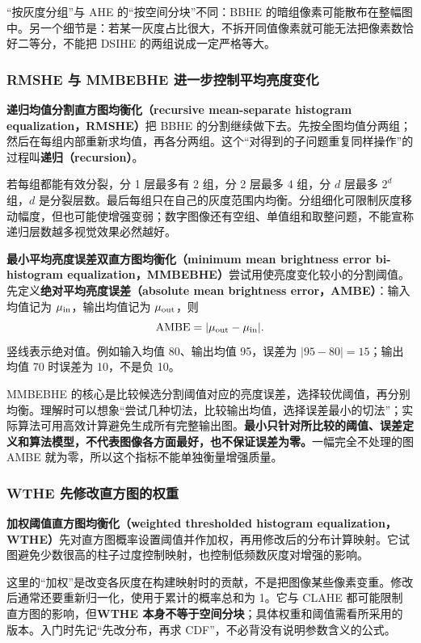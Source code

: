 “按灰度分组”与 AHE 的“按空间分块”不同：BBHE 的暗组像素可能散布在整幅图中。另一个细节是：若某一灰度占比很大，不拆开同值像素就可能无法把像素数恰好二等分，不能把 DSIHE 的两组说成一定严格等大。

\subsubsection*{RMSHE 与 MMBEBHE 进一步控制平均亮度变化}

\textbf{递归均值分割直方图均衡化（recursive mean-separate histogram equalization，RMSHE）}把 BBHE 的分割继续做下去。先按全图均值分两组；然后在每组内部重新求均值，再各分两组。这个“对得到的子问题重复同样操作”的过程叫\textbf{递归（recursion）}。

若每组都能有效分裂，分 1 层最多有 2 组，分 2 层最多 4 组，分 $d$ 层最多 $2^d$ 组，$d$ 是分裂层数。最后每组只在自己的灰度范围内均衡。分组细化可限制灰度移动幅度，但也可能使增强变弱；数字图像还有空组、单值组和取整问题，不能宣称递归层数越多视觉效果必然越好。

\textbf{最小平均亮度误差双直方图均衡化（minimum mean brightness error bi-histogram equalization，MMBEBHE）}尝试用使亮度变化较小的分割阈值。先定义\textbf{绝对平均亮度误差（absolute mean brightness error，AMBE）}：输入均值记为 $\mu_{\rm in}$，输出均值记为 $\mu_{\rm out}$，则
\[
\operatorname{AMBE}=|\mu_{\rm out}-\mu_{\rm in}|.
\]
竖线表示绝对值。例如输入均值 80、输出均值 95，误差为 $|95-80|=15$；输出均值 70 时误差为 10，不是负 10。

MMBEBHE 的核心是比较候选分割阈值对应的亮度误差，选择较优阈值，再分别均衡。理解时可以想象“尝试几种切法，比较输出均值，选择误差最小的切法”；实际算法可用高效计算避免生成所有完整输出图。\textbf{最小只针对所比较的阈值、误差定义和算法模型，不代表图像各方面最好，也不保证误差为零。}一幅完全不处理的图 AMBE 就为零，所以这个指标不能单独衡量增强质量。

\subsubsection*{WTHE 先修改直方图的权重}

\textbf{加权阈值直方图均衡化（weighted thresholded histogram equalization，WTHE）}先对直方图概率设置阈值并作加权，再用修改后的分布计算映射。它试图避免少数很高的柱子过度控制映射，也控制低频数灰度对增强的影响。

这里的“加权”是改变各灰度在构建映射时的贡献，不是把图像某些像素变重。修改后通常还要重新归一化，使用于累计的概率总和为 1。它与 CLAHE 都可能限制直方图的影响，但\textbf{WTHE 本身不等于空间分块}；具体权重和阈值需看所采用的版本。入门时先记“先改分布，再求 CDF”，不必背没有说明参数含义的公式。

